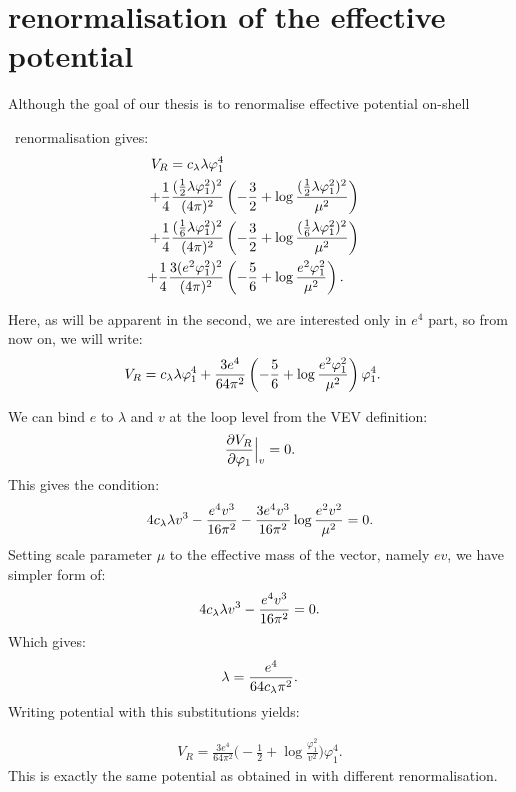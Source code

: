 \chapter{\texorpdfstring{\MSbar}{MS-bar} renormalisation of the effective potential}
Although the goal of our thesis is to renormalise effective potential on-shell

\MSbar\ renormalisation gives:
\begin{align}
V_{R}=c_\lambda\lambda\varphi_1^4 \notag \\
+ \frac{1}{4}\frac{(\frac{1}{2}\lambda\varphi_1^2)^2}{(4\pi)^2}&\left(-\frac{3}{2}+ 
\log{\frac{(\frac{1}{2}\lambda\varphi_1^2)^2}{\mu^2}}\right)\notag  \\
+\frac{1}{4}\frac{(\frac{1}{6}\lambda\varphi_1^2)^2}{(4\pi)^2}&\left(-\frac{3}{2}+ 
\log{\frac{(\frac{1}{6}\lambda\varphi_1^2)^2}{\mu^2}}\right) \notag \\
+\frac{1}{4}\frac{3(e^2\varphi_1^2)^2}{(4\pi)^2}&\left(-\frac{5}{6}+
\log{\frac{e^2\varphi_1^2}{\mu^2}}\right).
\end{align}

Here, as will be apparent in the second, we are interested only in $e^4$ part, so from now on, 
we will write:
\begin{align}
V_{R}=c_\lambda\lambda\varphi_1^4 + \frac{3e^4}{64\pi^2}&\left(-\frac{5}{6}+
\log{\frac{e^2\varphi_1^2}{\mu^2}}\right)\varphi_1^4.
\end{align}

We can bind $e$ to $\lambda$ and $v$ at the loop level from the VEV definition:
\begin{align}
\frac{\partial V_R}{\partial \varphi_1} \Big|_v= 0.
\end{align}
This gives the condition:
\begin{align}
4c_\lambda\lambda v^3-\frac{e^4v^3}{16\pi^2}-\frac{3e^4v^3}{16\pi^2}\log\frac{e^2v^2}{\mu^2}=0.
\end{align}
Setting scale parameter $\mu$ to the effective mass of the vector, namely $ev$, we have 
simpler form of:
\begin{align}
4c_\lambda\lambda v^3-\frac{e^4v^3}{16\pi^2}=0.
\end{align}
Which gives:
\begin{align}\label{e4_lambda_MS}
\lambda = \frac{e^4}{64c_\lambda\pi^2}.
\end{align}
Writing potential with this substitutions yields:

\begin{align}\label{MSbar_result}
V_R = \frac{3e^4}{64\pi^2}\Big(-\frac{1}{2}+\log\frac{\varphi_1^2}{v^2}\Big)\varphi_1^4.
\end{align}
This is exactly the same potential as obtained in \cite{Coleman1973} with different renormalisation.

